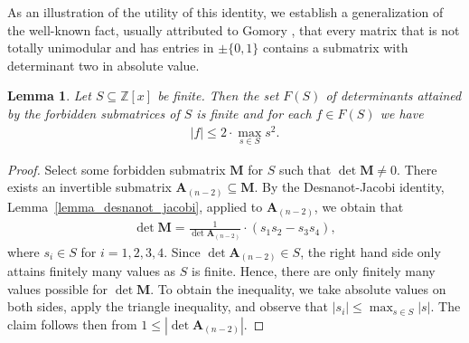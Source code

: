 \documentclass[a4paper, 11pt]{article}
\newcommand{\Z}{\mathbb{Z}}
\newcommand{\bA}{\bm{A}}
\newcommand{\bM}{\bm{M}}
\newcommand{\indet}{x}
\newcommand{\polyring}{\Z[\indet]}
\newcommand{\polyS}{S}
\newcommand{\polyM}{\bM}
\newtheorem{lemma}{Lemma}
\begin{document}
	
	As an illustration of the utility of this identity, we establish a generalization of the well-known fact, usually attributed to Gomory \cite{CORNUEJOLS200097}, that every matrix that is not totally unimodular and has entries in $\pm\lbrace 0,1\rbrace$ contains a submatrix with determinant two in absolute value. 
	
	\begin{lemma}{\cite[Lemma~2]{celayakuhlmannweismantel2024matricespolynomial}}
		\label{lemma_finite_number_of_determinants}
		Let $\polyS\subseteq \polyring$ be finite. Then the set $F(\polyS)$ of determinants attained by the forbidden submatrices of $\polyS$ is finite and for each $f\in F(\polyS)$ we have
		\begin{align*}
			|f|\leq 2\cdot \max_{s\in \polyS}s^2.
		\end{align*} 
	\end{lemma}
	\begin{proof}
		Select some forbidden submatrix $\polyM$ for $\polyS$ such that $\det\polyM\neq 0$. 
		There exists an invertible submatrix $\bA_{(n-2)}\subseteq \bM$. By the Desnanot-Jacobi identity, Lemma~\ref{lemma_desnanot_jacobi}, applied to $\bA_{(n-2)}$, we obtain that 
		\begin{align*}
			\det\polyM = \frac{1}{\det\bA_{(n-2)}}\cdot\left( s_1s_2-s_3s_4\right),
		\end{align*}
		where $s_i\in \polyS$ for $i=1,2,3,4$. Since $\det\bA_{(n-2)}\in S$, the right hand side only attains finitely many values as $\polyS$ is finite. Hence, there are only finitely many values possible for $\det\polyM$. 
		To obtain the inequality, we take absolute values on both sides, apply the triangle inequality, and observe that $\left|s_i\right|\leq \max_{s\in \polyS}\left|s\right|$. The claim follows then from $1\leq \left|\det\bA_{(n-2)}\right|$. 
	\end{proof}
	
\end{document}
